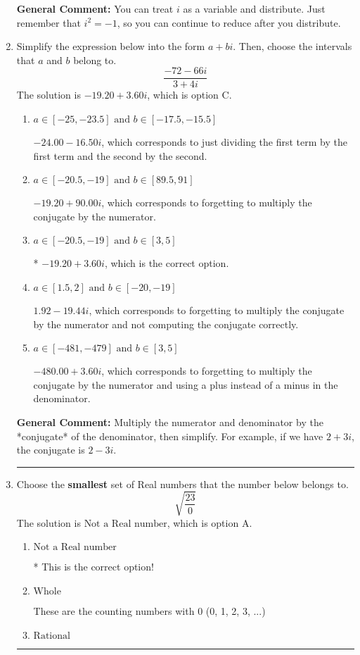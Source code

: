 \documentclass{extbook}[14pt]
\newcommand{\litem}[1]{\item #1

\rule{\textwidth}{0.4pt}}
\begin{document}
\begin{enumerate}
{\textbf{General Comment:} You can treat $i$ as a variable and distribute. Just remember that $i^2=-1$, so you can continue to reduce after you distribute.
}
\litem{
Simplify the expression below into the form $a+bi$. Then, choose the intervals that $a$ and $b$ belong to.
\[ \frac{-72 - 66 i}{3 + 4 i} \]The solution is \( -19.20  + 3.60 i \), which is option C.\begin{enumerate}[label=\Alph*.]
\item \( a \in [-25, -23.5] \text{ and } b \in [-17.5, -15.5] \)

 $-24.00  - 16.50 i$, which corresponds to just dividing the first term by the first term and the second by the second.
\item \( a \in [-20.5, -19] \text{ and } b \in [89.5, 91] \)

 $-19.20  + 90.00 i$, which corresponds to forgetting to multiply the conjugate by the numerator.
\item \( a \in [-20.5, -19] \text{ and } b \in [3, 5] \)

* $-19.20  + 3.60 i$, which is the correct option.
\item \( a \in [1.5, 2] \text{ and } b \in [-20, -19] \)

 $1.92  - 19.44 i$, which corresponds to forgetting to multiply the conjugate by the numerator and not computing the conjugate correctly.
\item \( a \in [-481, -479] \text{ and } b \in [3, 5] \)

 $-480.00  + 3.60 i$, which corresponds to forgetting to multiply the conjugate by the numerator and using a plus instead of a minus in the denominator.
\end{enumerate}

\textbf{General Comment:} Multiply the numerator and denominator by the *conjugate* of the denominator, then simplify. For example, if we have $2+3i$, the conjugate is $2-3i$.
}
\litem{
Choose the \textbf{smallest} set of Real numbers that the number below belongs to.
\[ \sqrt{\frac{23}{0}} \]The solution is \( \text{Not a Real number} \), which is option A.\begin{enumerate}[label=\Alph*.]
\item \( \text{Not a Real number} \)

* This is the correct option!
\item \( \text{Whole} \)

These are the counting numbers with 0 (0, 1, 2, 3, ...)
\item \( \text{Rational} \)


\end{enumerate}}
\end{enumerate}
\end{document}
